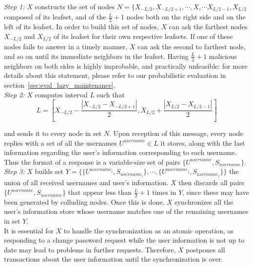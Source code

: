 \textit{Step 1:} $X$ constructs the set of nodes
$N = \{ X_{-L/2}, X_{-L/2 +1}, \cdots, X, \cdots X_{L/2 -1}, X_{L/2} $
composed of its leafset, and of the $\frac{L}{2} +1$ nodes both on the right
side and on the left of its leafset. 
In order to build this set of nodes, $X$ can ask the farthest nodes $X_{-L/2}$
and $X_{L/2}$ of its leafset for their own respective leafsets. If one of these
nodes fails to answer in a timely manner, $X$ can ask the second to farthest
node, and so on until its immediate neighbors in the leafset. Having
$\frac{L}{2} +1$ malicious neighbors on both sides is highly improbable, and
practically unfeasible: for more details about this statement, please refer to
our probabilistic evaluation in section~\eqref{sec:eval_lazy_maintenance}. \\

\textit{Step 2:} $X$ computes interval $L$ such that
$$
L = [ X_{-L/2} - \frac{| X_{-L/2} - X_{-L/2 +1} |}{2}, X_{L/2} +\frac{|
X_{L/2} - X_{L/2 -1} |}{2} ]
$$


and sends it to every node in set $N$. Upon reception of this message, every
node replies with a set of all the usernames $U^{username} \in L$ it
stores, along with the last information regarding the user's
information corresponding to each username. Thus the format of a response is a
variable-size set of pairs $\{ U^{username}, S_{username}\}$.\\


\textit{Step 3:} $X$ builds set 
$Y =  \{ \{U^{username_i}, S_{username_i}\},\cdots,\{ U^{username_j},
S_{username_j}\} \} $ the union of all received usernames and user's
information. $X$ then discards all pairs $\{ U^{username}, S_{username}\}$ that
appear less than $\frac{L}{2} +1$ times in $Y$, since these may have been
generated by colluding nodes. Once this is done, $X$ synchronizes all the
user's information store whose username matches one of the remaining usernames
in set $Y$.\\


It is essential for $X$ to handle the synchronization as an atomic operation,
as responding to a change password request while the user information is not up
to date may lead to problems in further requests. Therefore, $X$ postpones all
transactions about the user information until the synchronization is over.

